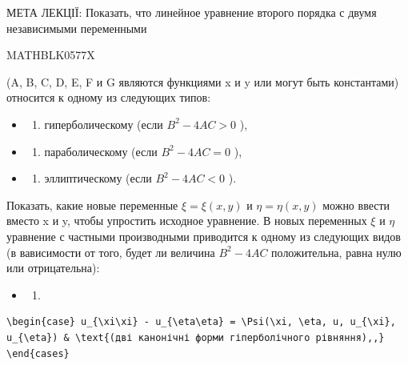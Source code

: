\documentclass[
  ukrainian,
]{article}
\providecommand{\tightlist}{%
  \setlength{\itemsep}{0pt}\setlength{\parskip}{0pt}}
\begin{document}
МЕТА ЛЕКЦІЇ: Показать, что линейное уравнение второго порядка с двумя
независимыми переменными

MATHBLK0577X

(A, B, C, D, E, F и G являются функциями x и y или могут быть
константами) относится к одному из следующих типов:

\begin{itemize}
\tightlist
\item
  \begin{enumerate}
  \def\labelenumi{\arabic{enumi})}
  \tightlist
  \item
    гиперболическому (если \(B^2 - 4AC > 0\) ),
  \end{enumerate}
\item
  \begin{enumerate}
  \def\labelenumi{\arabic{enumi})}
  \setcounter{enumi}{1}
  \tightlist
  \item
    параболическому (если \(B^2 - 4AC = 0\) ),
  \end{enumerate}
\item
  \begin{enumerate}
  \def\labelenumi{\arabic{enumi})}
  \setcounter{enumi}{2}
  \tightlist
  \item
    эллиптическому (если \(B^2 - 4AC < 0\) ).
  \end{enumerate}
\end{itemize}

Показать, какие новые переменные \(\xi = \xi(x, y)\) и
\(\eta = \eta(x, y)\) можно ввести вместо x и y, чтобы упростить
исходное уравнение. В новых переменных \(\xi\) и \(\eta\) уравнение с
частными производными приводится к одному из следующих видов (в
вависимости от того, будет ли величина \(B^2 - 4AC\) положительна, равна
нулю или отрицательна):

\begin{itemize}
\tightlist
\item
  \begin{enumerate}
  \def\labelenumi{\arabic{enumi}.}
  \tightlist
  \item
  \end{enumerate}
\end{itemize}

\begin{verbatim}
\begin{case} u_{\xi\xi} - u_{\eta\eta} = \Psi(\xi, \eta, u, u_{\xi}, u_{\eta}) & \text{(дві канонічні форми гіперболічного рівняння),,} \end{cases}
\end{verbatim}
\end{document}
